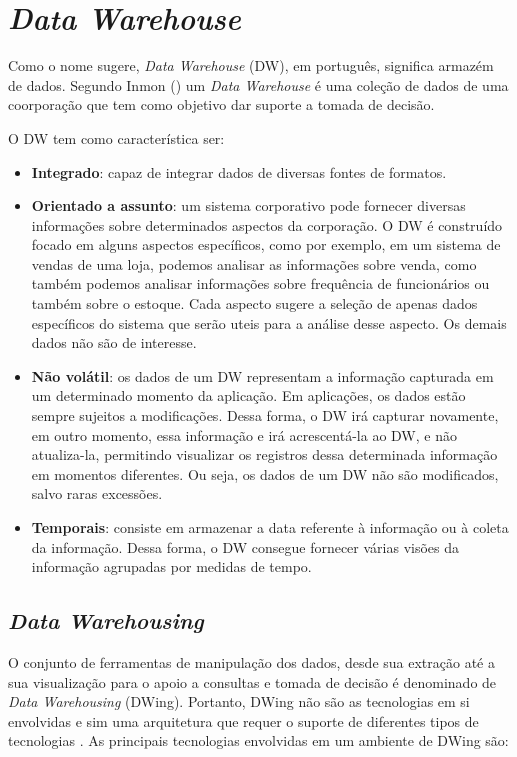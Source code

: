 \chapter{\emph{Data Warehouse}}
\label{cap-dw}

%

Como o nome sugere, \emph{Data Warehouse} (DW), em português, significa armazém de dados. Segundo Inmon (\citeyear{inmon2002}) um \emph{Data Warehouse} é uma coleção de dados de uma coorporação que tem como objetivo dar suporte a tomada de decisão.

%

O DW tem como característica ser:

%

\begin{itemize}
\item \textbf{Integrado}: capaz de integrar dados de diversas fontes de formatos.
\item \textbf{Orientado a assunto}: um sistema corporativo pode fornecer diversas informações sobre determinados aspectos da corporação. O DW é construído focado em alguns aspectos específicos, como por exemplo, em um sistema de vendas de uma loja, podemos analisar as informações sobre venda, como também podemos analisar informações sobre frequência de funcionários ou também sobre o estoque. Cada aspecto sugere a seleção de apenas dados específicos do sistema que serão uteis para a análise desse aspecto. Os demais dados não são de interesse.
\item \textbf{Não volátil}: os dados de um DW representam a informação capturada em um determinado momento da aplicação. Em aplicações, os dados estão sempre sujeitos a modificações. Dessa forma, o DW irá capturar novamente, em outro momento, essa informação e irá acrescentá-la ao DW, e não atualiza-la, permitindo visualizar os registros dessa determinada informação em momentos diferentes. Ou seja, os dados de um DW não são modificados, salvo raras excessões.
\item \textbf{Temporais}: consiste em armazenar a data referente à informação ou à coleta da informação. Dessa forma, o DW consegue fornecer várias visões da informação agrupadas por medidas de tempo. 
\end{itemize}

\section{\emph{Data Warehousing}}

O conjunto de ferramentas de manipulação dos dados, desde sua extração até a sua visualização para o apoio a consultas e tomada de decisão é denominado de \emph{Data Warehousing} (DWing). Portanto,  DWing não são as tecnologias em si envolvidas e sim uma arquitetura que requer o suporte de diferentes tipos de tecnologias \cite{inmon2002}.  As principais tecnologias envolvidas em um ambiente de DWing são:

